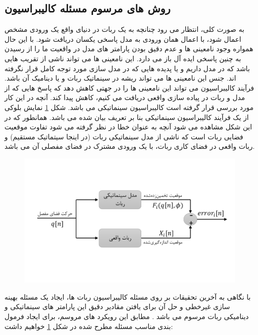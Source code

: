 \subsection{روش های مرسوم مسئله کالیبراسیون} \label{seq:conventional_calibration}
به صورت کلی، انتظار می رود چنانچه به یک ربات در دنیای واقع یک ورودی مشخص اعمال شود، با اعمال همان ورودی به مدل پاسخی یکسان دریافت شود. با این حال همواره وجود نامعینی ها و عدم دقیق بودن پارامتر های مدل در واقعیت ما را از رسیدن به چنین پاسخی ایده آل باز می دارد. این نامعینی ها می تواند ناشی از تقریب هایی باشد که در مدل داریم و یا پدیده هایی که در مدل سازی مورد توجه کامل قرار نگرفته اند. جنس این نامعینی ها می تواند ریشه در سینماتیک ربات و یا دینامیک آن باشد. فرآیند کالیبراسیون می تواند این نامعینی ها را در جهتی کاهش دهد که پاسخ هایی که از مدل و ربات در پیاده سازی واقعی دریافت می کنیم، کاهش پیدا کند. آنچه در این کار مورد بررسی قرار گرفته است کالیبراسیون سینماتیکی می باشد. شکل \ref{fig:kinematicmodelerror} نمایش بلوکی از یک فرآیند کالیبراسیون سینماتیکی بنا بر تعریف بیان شده می باشد. همانطور که در این شکل مشاهده می شود آنچه به عنوان خطا در نظر گرفته می شود تفاوت موقعیت فضایی ربات است که ناشی از مدل سینماتیکی ربات (در اینجا سیتماتیک مستقیم) و ربات واقعی در فضای کاری ربات، با یک ورودی مشترک در فضای مفصلی آن می باشد. 

\begin{figure}[!t]
	\centering
	\includegraphics[width=0.8\linewidth, trim={0cm 2.2cm 0cm 2.2cm}, clip]{img/kinematic_model_error}
	\caption{}
	\label{fig:kinematicmodelerror}
\end{figure}


با نگاهی به آخرین تحقیقات بر روی مسئله کالیبراسیون ربات ها، ایجاد یک مسئله بهینه سازی غیرخطی و حل آن برای یافتن مقادیر دقیق این پارامتر های سینماتیکی و دینامیکی ربات مرسوم می باشد
\cite{elatta2004overview,ida2019automatic,ida2022identification,ida2021dynamics}.
مطابق این رویکرد های مروسم، برای ایجاد فرمول بندی مناسب مسئله مطرح شده در شکل \ref{fig:kinematicmodelerror} خواهیم داشت:

